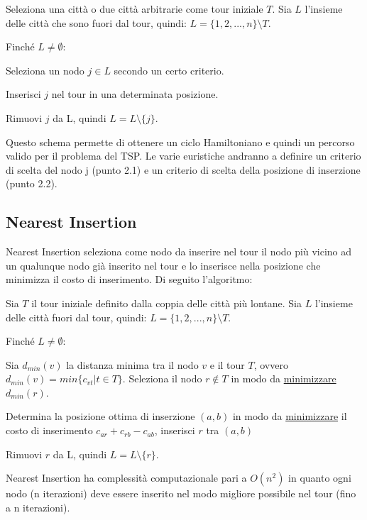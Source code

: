 \documentclass[a4paper,12pt]{report}
\begin{document}
\begin{tcolorbox}[colframe=black,colback=white,boxrule=0.5pt, sharp corners]
\begin{legal}
  \item Seleziona una città o due città arbitrarie come tour iniziale $T$. Sia $L$ l'insieme delle città che sono fuori dal tour, quindi: $L = \{1, 2, ..., n\} \setminus T$.
  \item Finché $L \neq \emptyset$:
  \begin{legal}
    \item Seleziona un nodo $j \in L$ secondo un certo criterio.
    \item Inserisci $j$ nel tour in una determinata posizione.
    \item Rimuovi $j$ da L, quindi $L = L \setminus \{j\}$.
  \end{legal}
\end{legal}
\end{tcolorbox}
\hfill \break
Questo schema permette di ottenere un ciclo Hamiltoniano e quindi un percorso valido per il problema del TSP. Le varie euristiche andranno a definire un criterio di scelta del nodo j (punto 2.1) e un criterio di scelta della posizione di inserzione (punto 2.2).

\subsection{Nearest Insertion} \label{ssec:NI}
Nearest Insertion seleziona come nodo da inserire nel tour il nodo più vicino ad un qualunque nodo già inserito nel tour e lo inserisce nella posizione che minimizza il costo di inserimento. Di seguito l'algoritmo:

\begin{tcolorbox}[colframe=black,colback=white,boxrule=0.5pt, sharp corners]
  \begin{legal}
    \item Sia $T$ il tour iniziale definito dalla coppia delle città più lontane. Sia $L$ l'insieme delle città fuori dal tour, quindi: $L = \{1, 2, ..., n\} \setminus T$.
    \item Finché $L \neq \emptyset$:
    \begin{legal}
      \item Sia $d_{min}(v)$ la distanza minima tra il nodo $v$ e il tour $T$, ovvero $d_{min}(v) = min\{c_{vt} | t \in T \}$. Seleziona il nodo $r \not \in T$ in modo da \underline{minimizzare} $d_{min}(r)$.
      \item Determina la posizione ottima di inserzione $(a, b)$ in modo da \underline{minimizzare} il costo di inserimento $c_{ar} + c_{rb} - c_{ab}$, inserisci $r$ tra $(a, b)$
      \item Rimuovi $r$ da L, quindi $L = L \setminus \{r\}$.
    \end{legal}
  \end{legal}
  \end{tcolorbox}
\hfill \break Nearest Insertion ha complessità computazionale pari a $O(n^2)$ in quanto ogni nodo (n iterazioni) deve essere inserito nel modo migliore possibile nel tour (fino a n iterazioni).
\end{document}
